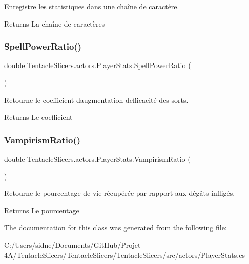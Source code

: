 Enregistre les statistiques dans une chaîne de caractère. 

\begin{DoxyReturn}{Returns}
La chaîne de caractères 
\end{DoxyReturn}
\mbox{\label{class_tentacle_slicers_1_1actors_1_1_player_stats_a744a660037a39b93d43eb9f27346ae09}} 
\subsubsection{\texorpdfstring{Spell\+Power\+Ratio()}{SpellPowerRatio()}}
{\footnotesize\ttfamily double Tentacle\+Slicers.\+actors.\+Player\+Stats.\+Spell\+Power\+Ratio (\begin{DoxyParamCaption}{ }\end{DoxyParamCaption})}



Retourne le coefficient d\textquotesingle{}augmentation d\textquotesingle{}efficacité des sorts. 

\begin{DoxyReturn}{Returns}
Le coefficient 
\end{DoxyReturn}
\mbox{\label{class_tentacle_slicers_1_1actors_1_1_player_stats_aee8ecef8466079afcd359984e9bfc7dd}} 
\subsubsection{\texorpdfstring{Vampirism\+Ratio()}{VampirismRatio()}}
{\footnotesize\ttfamily double Tentacle\+Slicers.\+actors.\+Player\+Stats.\+Vampirism\+Ratio (\begin{DoxyParamCaption}{ }\end{DoxyParamCaption})}



Retourne le pourcentage de vie récupérée par rapport aux dégâts infligés. 

\begin{DoxyReturn}{Returns}
Le pourcentage 
\end{DoxyReturn}


The documentation for this class was generated from the following file\+:\begin{DoxyCompactItemize}
\item 
C\+:/\+Users/sidne/\+Documents/\+Git\+Hub/\+Projet 4\+A/\+Tentacle\+Slicers/\+Tentacle\+Slicers/\+Tentacle\+Slicers/src/actors/Player\+Stats.\+cs\end{DoxyCompactItemize}
